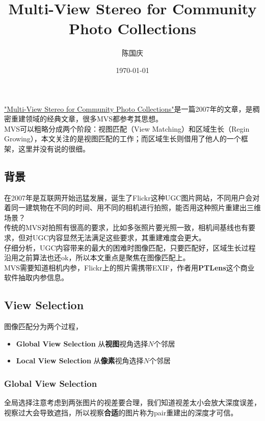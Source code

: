 \documentclass[hpyerref,UTF8,a4paper,titlepage,12pt,oneside]{ctexbook}
\title{Multi-View Stereo for Community Photo Collections}
\author{陈国庆}
\date{\today}
\theoremstyle{definition}
\begin{document}
\tableofcontents

\href{https://hhoppe.com/mvscpc.pdf}{"Multi-View Stereo for Community Photo Collections"}是一篇2007年的文章，是稠密重建领域的经典文章，很多MVS都参考其思想。\\

MVS可以粗略分成两个阶段：视图匹配（View Matching）和区域生长（Regin Growing），本文关注的是视图匹配的工作；而区域生长则借用了他人的一个框架，这里并没有说的很细。\\

\subsection{背景}
在2007年是互联网开始迅猛发展，诞生了Flickr这种UGC图片网站，不同用户会对着同一建筑物在不同的时间、用不同的相机进行拍照，能否用这种照片重建出三维场景？\\

传统的MVS对拍照有很高的要求，比如多张照片要光照一致，相机间基线也有要求，但对UGC内容显然无法满足这些要求，其重建难度会更大。\\

仔细分析，UGC内容带来的最大的困难时图像匹配，只要匹配好，区域生长过程沿用之前算法也还ok，所以本文重点是聚焦在图像匹配上。\\

MVS需要知道相机内参，Flickr上的照片需携带EXIF，作者用\textbf{PTLens}这个商业软件抽取内参信息。\\

\subsection{View Selection}

图像匹配分为两个过程，
\begin{itemize}
	\item \textbf{Global View Selection} 从\textbf{视图}视角选择$N$个邻居
	\item \textbf{Local View Selection} 从\textbf{像素}视角选择$N$个邻居
\end{itemize}

\subsubsection*{Global View Selection}
	全局选择注意考虑到两张图片的视差要合理，我们知道视差太小会放大深度误差，视察过大会导致遮挡，所以视察\textbf{合适}的图片称为pair重建出的深度才可信。\\
\end{document}
